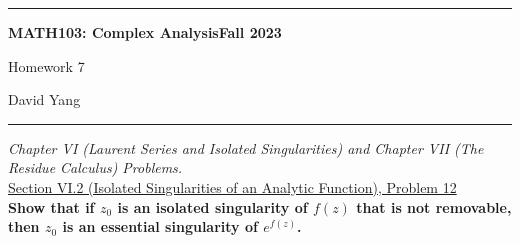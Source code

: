 \documentclass[11pt]{article}
\theoremstyle{definition}
\begin{document}
	\hrule
	\begin{center}
        \textbf{MATH103: Complex Analysis}\hfill \textbf{Fall 2023}\newline


		{\Large Homework 7}

		David Yang
	\end{center}

\hrule

\vspace{1em}


\textit{Chapter VI (Laurent Series and Isolated Singularities) and Chapter VII (The Residue Calculus) Problems.} \\

\underline{Section VI.2 (Isolated Singularities of an Analytic Function), Problem 12}\\

\textbf{Show that if $z_0$ is an isolated singularity of $f(z)$ that is not removable, then $z_0$ is an essential singularity of $e^{f(z)}$.}
\end{document}
